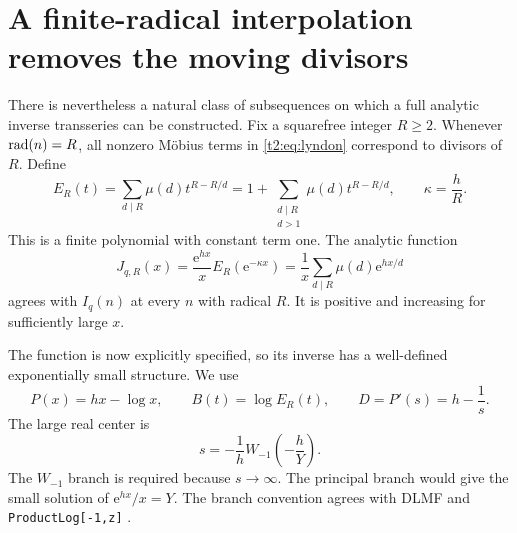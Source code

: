 \documentclass[11pt,openany]{book}
\numberwithin{equation}{chapter}
\theoremstyle{plain}
\theoremstyle{definition}
\theoremstyle{remark}
\newcommand{\ee}{\mathrm e}
\begin{document}
\section{A finite-radical interpolation removes the moving divisors}

There is nevertheless a natural class of subsequences on which a full analytic inverse transseries can be constructed. Fix a squarefree integer $R\ge2$. Whenever $\operatorname{rad}(n)=R$, all nonzero M\"obius terms in \eqref{t2:eq:lyndon} correspond to divisors of $R$. Define
\begin{equation}\label{t3:eq:ER}
 E_R(t)=\sum_{d\mid R}\mu(d)t^{R-R/d}
       =1+\sum_{\substack{d\mid R\\d>1}}\mu(d)t^{R-R/d},
 \qquad \kappa=\frac hR.
\end{equation}
This is a finite polynomial with constant term one. The analytic function
\begin{equation}\label{t3:eq:fixedradical-function}
 J_{q,R}(x)=\frac{\ee^{hx}}x E_R(\ee^{-\kappa x})
          =\frac1x\sum_{d\mid R}\mu(d)\ee^{hx/d}
\end{equation}
agrees with $I_q(n)$ at every $n$ with radical $R$. It is positive and increasing for sufficiently large $x$.

The function is now explicitly specified, so its inverse has a well-defined exponentially small structure. We use
\begin{equation}\label{t3:eq:logphase}
 P(x)=hx-\log x,\qquad B(t)=\log E_R(t),\qquad
 D=P'(s)=h-\frac1s.
\end{equation}
The large real center is
\begin{equation}\label{t3:eq:Wcenter}
 \boxed{\displaystyle
 s=-\frac1h W_{-1}\!\left(-\frac hY\right).}
\end{equation}
The $W_{-1}$ branch is required because $s\to\infty$. The principal branch would give the small solution of $\ee^{hx}/x=Y$. The branch convention agrees with DLMF and \texttt{ProductLog[-1,z]} \cite{dlmfW,wlproductlog}.
\end{document}
